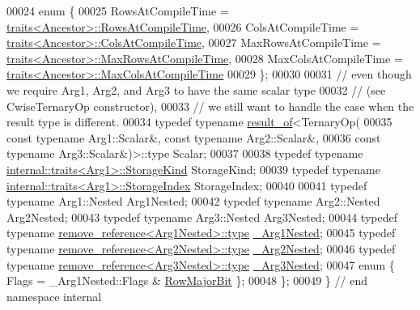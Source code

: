 \begin{DoxyCode}
00024   \textcolor{keyword}{enum} \{
00025     RowsAtCompileTime = \hyperlink{struct_eigen_1_1internal_1_1traits}{traits<Ancestor>::RowsAtCompileTime},
00026     ColsAtCompileTime = \hyperlink{struct_eigen_1_1internal_1_1traits}{traits<Ancestor>::ColsAtCompileTime},
00027     MaxRowsAtCompileTime = \hyperlink{struct_eigen_1_1internal_1_1traits}{traits<Ancestor>::MaxRowsAtCompileTime},
00028     MaxColsAtCompileTime = \hyperlink{struct_eigen_1_1internal_1_1traits}{traits<Ancestor>::MaxColsAtCompileTime}
00029   \};
00030 
00031   \textcolor{comment}{// even though we require Arg1, Arg2, and Arg3 to have the same scalar type}
00032   \textcolor{comment}{// (see CwiseTernaryOp constructor),}
00033   \textcolor{comment}{// we still want to handle the case when the result type is different.}
00034   \textcolor{keyword}{typedef} \textcolor{keyword}{typename} \hyperlink{struct_eigen_1_1internal_1_1result__of}{result\_of}<TernaryOp(
00035       \textcolor{keyword}{const} \textcolor{keyword}{typename} Arg1::Scalar&, \textcolor{keyword}{const} \textcolor{keyword}{typename} Arg2::Scalar&,
00036       \textcolor{keyword}{const} \textcolor{keyword}{typename} Arg3::Scalar&)>::type Scalar;
00037 
00038   \textcolor{keyword}{typedef} \textcolor{keyword}{typename} \hyperlink{struct_eigen_1_1internal_1_1traits}{internal::traits<Arg1>::StorageKind} StorageKind;
00039   \textcolor{keyword}{typedef} \textcolor{keyword}{typename} \hyperlink{struct_eigen_1_1internal_1_1traits}{internal::traits<Arg1>::StorageIndex} StorageIndex;
00040 
00041   \textcolor{keyword}{typedef} \textcolor{keyword}{typename} Arg1::Nested Arg1Nested;
00042   \textcolor{keyword}{typedef} \textcolor{keyword}{typename} Arg2::Nested Arg2Nested;
00043   \textcolor{keyword}{typedef} \textcolor{keyword}{typename} Arg3::Nested Arg3Nested;
00044   \textcolor{keyword}{typedef} \textcolor{keyword}{typename} \hyperlink{group___sparse_core___module}{remove\_reference<Arg1Nested>::type} 
      \hyperlink{group___sparse_core___module}{\_Arg1Nested};
00045   \textcolor{keyword}{typedef} \textcolor{keyword}{typename} \hyperlink{group___sparse_core___module}{remove\_reference<Arg2Nested>::type} 
      \hyperlink{group___sparse_core___module}{\_Arg2Nested};
00046   \textcolor{keyword}{typedef} \textcolor{keyword}{typename} \hyperlink{group___sparse_core___module}{remove\_reference<Arg3Nested>::type} 
      \hyperlink{group___sparse_core___module}{\_Arg3Nested};
00047   \textcolor{keyword}{enum} \{ Flags = \_Arg1Nested::Flags & \hyperlink{group__flags_gae4f56c2a60bbe4bd2e44c5b19cbe8762}{RowMajorBit} \};
00048 \};
00049 \}  \textcolor{comment}{// end namespace internal}

\end{DoxyCode}
